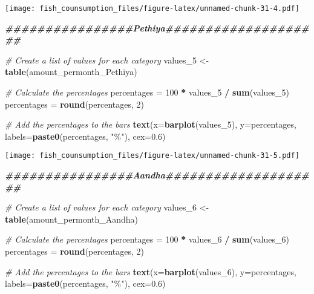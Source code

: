 \documentclass[
]{article}
\newenvironment{Shaded}{\begin{snugshade}}{\end{snugshade}}
\newcommand{\AttributeTok}[1]{\textcolor[rgb]{0.13,0.29,0.53}{#1}}
\newcommand{\CommentTok}[1]{\textcolor[rgb]{0.56,0.35,0.01}{\textit{#1}}}
\newcommand{\DecValTok}[1]{\textcolor[rgb]{0.00,0.00,0.81}{#1}}
\newcommand{\DocumentationTok}[1]{\textcolor[rgb]{0.56,0.35,0.01}{\textbf{\textit{#1}}}}
\newcommand{\FloatTok}[1]{\textcolor[rgb]{0.00,0.00,0.81}{#1}}
\newcommand{\FunctionTok}[1]{\textcolor[rgb]{0.13,0.29,0.53}{\textbf{#1}}}
\newcommand{\NormalTok}[1]{#1}
\newcommand{\OtherTok}[1]{\textcolor[rgb]{0.56,0.35,0.01}{#1}}
\newcommand{\SpecialCharTok}[1]{\textcolor[rgb]{0.81,0.36,0.00}{\textbf{#1}}}
\newcommand{\StringTok}[1]{\textcolor[rgb]{0.31,0.60,0.02}{#1}}
\begin{document}
\texttt{[image: fish\_counsumption\_files/figure-latex/unnamed-chunk-31-4.pdf]}

\begin{Shaded}
\begin{Highlighting}[]
\DocumentationTok{\#\#\#\#\#\#\#\#\#\#\#\#\#\#\#\#Pethiya\#\#\#\#\#\#\#\#\#\#\#\#\#\#\#\#\#\#\#\#}

\CommentTok{\# Create a list of values for each category}
\NormalTok{values\_5 }\OtherTok{\textless{}{-}} \FunctionTok{table}\NormalTok{(amount\_permonth\_Pethiya)}

\CommentTok{\# Calculate the percentages}
\NormalTok{percentages }\OtherTok{=} \DecValTok{100} \SpecialCharTok{*}\NormalTok{ values\_5 }\SpecialCharTok{/} \FunctionTok{sum}\NormalTok{(values\_5)}
\NormalTok{percentages }\OtherTok{=} \FunctionTok{round}\NormalTok{(percentages, }\DecValTok{2}\NormalTok{)}

\CommentTok{\# Add the percentages to the bars}
\FunctionTok{text}\NormalTok{(}\AttributeTok{x=}\FunctionTok{barplot}\NormalTok{(values\_5), }\AttributeTok{y=}\NormalTok{percentages, }\AttributeTok{labels=}\FunctionTok{paste0}\NormalTok{(percentages, }\StringTok{"\%"}\NormalTok{), }\AttributeTok{cex=}\FloatTok{0.6}\NormalTok{)}
\end{Highlighting}
\end{Shaded}

\texttt{[image: fish\_counsumption\_files/figure-latex/unnamed-chunk-31-5.pdf]}

\begin{Shaded}
\begin{Highlighting}[]
\DocumentationTok{\#\#\#\#\#\#\#\#\#\#\#\#\#\#\#\#Aandha\#\#\#\#\#\#\#\#\#\#\#\#\#\#\#\#\#\#\#\#}

\CommentTok{\# Create a list of values for each category}
\NormalTok{values\_6 }\OtherTok{\textless{}{-}} \FunctionTok{table}\NormalTok{(amount\_permonth\_Aandha)}

\CommentTok{\# Calculate the percentages}
\NormalTok{percentages }\OtherTok{=} \DecValTok{100} \SpecialCharTok{*}\NormalTok{ values\_6 }\SpecialCharTok{/} \FunctionTok{sum}\NormalTok{(values\_6)}
\NormalTok{percentages }\OtherTok{=} \FunctionTok{round}\NormalTok{(percentages, }\DecValTok{2}\NormalTok{)}

\CommentTok{\# Add the percentages to the bars}
\FunctionTok{text}\NormalTok{(}\AttributeTok{x=}\FunctionTok{barplot}\NormalTok{(values\_6), }\AttributeTok{y=}\NormalTok{percentages, }\AttributeTok{labels=}\FunctionTok{paste0}\NormalTok{(percentages, }\StringTok{"\%"}\NormalTok{), }\AttributeTok{cex=}\FloatTok{0.6}\NormalTok{)}
\end{Highlighting}
\end{Shaded}
\end{document}
